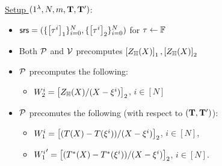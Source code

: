 \begin{figure}[tb!]
    \begin{mdframed}

		\underline{Setup $(1^{\lambda},N,m, \mathbf{T}, \mathbf{T}')$}: 
		\begin{itemize}[leftmargin=1em]
			\item $\mathsf{srs} = (\{\left[{\tau^i}\right]_1\}_{i=0}^N, \{\left[{\tau^i}\right]_2\}_{i=0}^N)$ for $\tau\gets \mathbb{F}$
			\item Both $\mathcal{P}$ and $\mathcal{V}$ precomputes $\left[{Z_\mathbb{H}(X)}\right]_1, \left[{Z_\mathbb{H}(X)}\right]_2$
			\item $\mathcal{P}$ precomputes the following:
			\begin{itemize}[leftmargin=1em]
				\item $W_2^i=\left[{Z_\mathbb{H}(X)/(X-\xi^i)}\right]_2$, $i\in [N]$
			\end{itemize}
			\item $\mathcal{P}$ precomutes the following (with respect to $(\mathbf{T}, \mathbf{T}')$):
			 \begin{itemize}[leftmargin=1em]
				\item $W_1^i=\left[{(T(X)-T(\xi^i))/(X-\xi^i)}\right]_2$, $i\in [N]$,
				\item ${W_1^i}'=\left[{(T^*(X) - T^*(\xi^i))/(X-\xi^i)}\right]_2$, $i\in [N]$.
			\end{itemize}
		\end{itemize}
		


\end{mdframed}
\end{figure}
